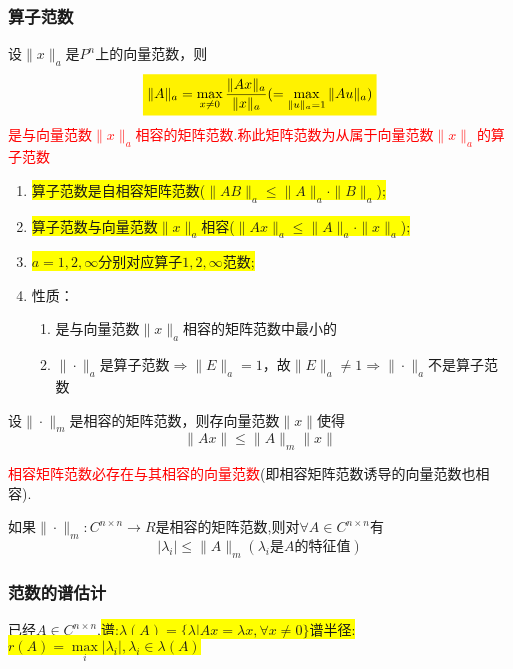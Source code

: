 \subsubsection{算子范数}
\begin{theorem}
	设$\|x\|_a$是$P^n$上的向量范数，则
	\[
	\colorbox{yellow}{$\|A\|_a=\max\limits_{x\ne 0}\dfrac{\|Ax\|_a}{\|x\|_a}(=\max\limits_{\|u\|_a=1}\|Au\|_a)$}
	\]
	\textcolor{red}{是与向量范数$\|x\|_a$相容的矩阵范数.称此矩阵范数为从属于向量范数$\|x\|_a$的算子范数}
\end{theorem}
\begin{note}
	\begin{enumerate}
		\item \colorbox{yellow}{算子范数是自相容矩阵范数($ \|A B\|_a \leq\|A\|_a \cdot\|B\|_a$);}
		\item\colorbox{yellow}{算子范数与向量范数$\|x\|_a$相容($ \|Ax\|_a \leq\|A\|_a \cdot\|x\|_a$);}
		\item\colorbox{yellow}{$a=1,2,\infty$分别对应算子$1,2,\infty$范数;}
		\item 性质：
		 \begin{enumerate}
		 \item 是与向量范数$\|x\|_a$相容的矩阵范数中最小的
		 \item $\|\cdot\|_a$是算子范数$\Rightarrow\|E\|_a=1$，故$\|E\|_a\ne1\Rightarrow$$\|\cdot\|_a$不是算子范数
		 \end{enumerate}
	\end{enumerate}
\end{note}


\begin{theorem}
设$\|\cdot\|_{m}$是相容的矩阵范数，则存向量范数$\|x\|$使得
\[
\|Ax\|\leq \|A\|_{m}\|x\|
\]
\end{theorem}
\begin{note}
\textcolor{red}{相容矩阵范数必存在与其相容的向量范数}(即相容矩阵范数诱导的向量范数也相容).
\end{note}


\begin{theorem}
	\label{eeedd}
	如果$\|\cdot\|_{m}:C^{n\times n}\rightarrow R$是相容的矩阵范数,则对$\forall A\in C^{n\times n}$有
	\[
	|\lambda_i|\leq \|A\|_m(\lambda_i\mbox{是$A$的特征值})
	\]

\end{theorem}

\subsubsection{范数的谱估计}
已经$A\in C^{n\times n}$,\colorbox{yellow}{谱:$\lambda(A)=\{\lambda|Ax=\lambda x,\forall x\ne 0\}$\qquad 谱半径:$r(A)=\max\limits_{i}|\lambda_i|,\lambda_i\in \lambda(A)$}

